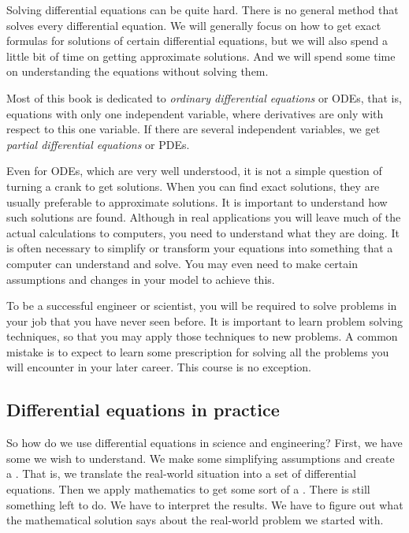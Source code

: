 Solving differential equations can be quite hard.  
There is no general method that solves every differential equation.  We will
generally focus on how to get exact formulas for solutions of certain
differential
equations, but we will also spend a little bit of time
on getting approximate solutions.
And we will spend some time on understanding the equations without solving
them.

Most of this book is dedicated to
\emph{ordinary differential equations}
or ODEs, that is, equations with
only one independent variable, where derivatives are only with respect to
this one variable.
If there are several independent variables, we get
\emph{partial differential equations}
or PDEs.

Even for ODEs, which are very well understood, it is not a simple question
of turning a crank to get solutions.  
When you can find exact solutions, they are usually preferable to 
approximate solutions.  It is important to understand how
such solutions are found.
Although in real applications you will
leave much of the actual calculations to computers, you
need to understand what they are doing.  It is often necessary
to simplify or transform your equations into something that a computer can
understand and solve.
You may even need to make certain assumptions and changes in your
model to achieve this.

To be a successful engineer or scientist, you will be required to solve
problems in your job that you have never seen before.  It is important to
learn problem solving techniques, so that you may apply those techniques to
new problems.  A common mistake is to expect to learn some prescription for
solving all the problems you will encounter in your later career.  This
course is no exception.

\subsection{Differential equations in practice}

\begin{mywrapfigsimp}{3.05in}{3.35in}
\noindent
{}
\diffypdfversion{\par\vspace*{5pt}}
\end{mywrapfigsimp}
So how do we use differential equations in science and engineering?  
First, we have some \emph{} we wish
to understand.
We make some simplifying assumptions and create a
\emph{}.
That is, we translate the real-world situation into a
set of differential equations.
Then we apply mathematics to get some sort of a
\emph{}.
There is still something left to do.  We have to interpret the results.
We have to figure out what the mathematical solution says about the real-world
problem we started with.


